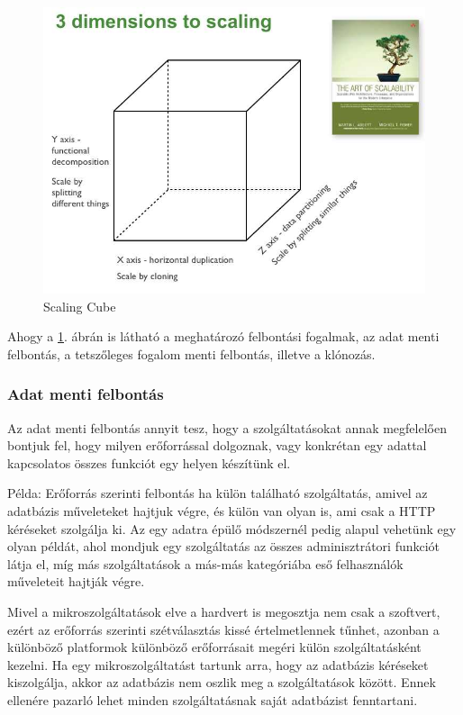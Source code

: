 \documentclass[11pt,magyar,a4paper,twoside,]{report}
\let\Oldincludegraphics\includegraphics
\renewcommand{\includegraphics}[1]{
\begin{adjustbox}{max size={\textwidth}{\textheight}}
    \Oldincludegraphics[scale=0.6]{#1}%
\end{adjustbox}
}
\begin{document}
\begin{figure}[H]
\centering
\includegraphics{img/ScaleCude.jpg}
\caption{Scaling Cube\citep{scale-cube}\label{scalecube}}
\end{figure}

Ahogy a \ref{scalecube}. ábrán is látható a meghatározó felbontási
fogalmak, az adat menti felbontás, a tetszőleges fogalom menti
felbontás, illetve a klónozás.

\subsubsection{Adat menti felbontás}\label{adat-menti-felbontuxe1s}

Az adat menti felbontás annyit tesz, hogy a szolgáltatásokat annak
megfelelően bontjuk fel, hogy milyen erőforrással dolgoznak, vagy
konkrétan egy adattal kapcsolatos összes funkciót egy helyen készítünk
el.

Példa: Erőforrás szerinti felbontás ha külön található szolgáltatás,
amivel az adatbázis műveleteket hajtjuk végre, és külön van olyan is,
ami csak a HTTP kéréseket szolgálja ki. Az egy adatra épülő módszernél
pedig alapul vehetünk egy olyan példát, ahol mondjuk egy szolgáltatás az
összes adminisztrátori funkciót látja el, míg más szolgáltatások a
más-más kategóriába eső felhasználók műveleteit hajtják végre.

Mivel a mikroszolgáltatások elve a hardvert is megosztja nem csak a
szoftvert, ezért az erőforrás szerinti szétválasztás kissé
értelmetlennek tűnhet, azonban a különböző platformok különböző
erőforrásait megéri külön szolgáltatásként kezelni. Ha egy
mikroszolgáltatást tartunk arra, hogy az adatbázis kéréseket
kiszolgálja, akkor az adatbázis nem oszlik meg a szolgáltatások között.
Ennek ellenére pazarló lehet minden szolgáltatásnak saját adatbázist
fenntartani.
\end{document}
